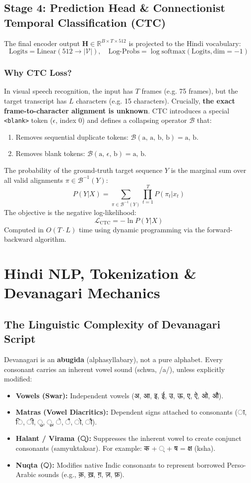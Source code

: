 \documentclass[11pt,a4paper]{article}
\begin{document}
\subsection{Stage 4: Prediction Head \& Connectionist Temporal Classification (CTC)}
The final encoder output $\mathbf{H} \in \mathbb{R}^{B \times T \times 512}$ is projected to the Hindi vocabulary:
$$\text{Logits} = \text{Linear}(512 \to |\mathcal{V}|), \quad \text{Log-Probs} = \log\text{softmax}(\text{Logits}, \text{dim}=-1)$$

\subsubsection{Why CTC Loss?}
In visual speech recognition, the input has $T$ frames (e.g. 75 frames), but the target transcript has $L$ characters (e.g. 15 characters). Crucially, \textbf{the exact frame-to-character alignment is unknown}.
CTC introduces a special \texttt{<blank>} token ($\epsilon$, index 0) and defines a collapsing operator $\mathcal{B}$ that:
\begin{enumerate}
    \item Removes sequential duplicate tokens: $\mathcal{B}(\text{a, a, b, b}) = \text{a, b}$.
    \item Removes blank tokens: $\mathcal{B}(\text{a, } \epsilon\text{, b}) = \text{a, b}$.
\end{enumerate}
The probability of the ground-truth target sequence $Y$ is the marginal sum over all valid alignments $\pi \in \mathcal{B}^{-1}(Y)$:
$$P(Y|X) = \sum_{\pi \in \mathcal{B}^{-1}(Y)} \prod_{t=1}^T P(\pi_t | x_t)$$
The objective is the negative log-likelihood:
$$\mathcal{L}_{\text{CTC}} = -\ln P(Y|X)$$
Computed in $O(T \cdot L)$ time using dynamic programming via the forward-backward algorithm.

\section{Hindi NLP, Tokenization \& Devanagari Mechanics}
\subsection{The Linguistic Complexity of Devanagari Script}
Devanagari is an \textbf{abugida} (alphasyllabary), not a pure alphabet. Every consonant carries an inherent vowel sound (schwa, /a/), unless explicitly modified:
\begin{itemize}
    \item \textbf{Vowels (Swar):} Independent vowels (अ, आ, इ, ई, उ, ऊ, ए, ऐ, ओ, औ).
    \item \textbf{Matras (Vowel Diacritics):} Dependent signs attached to consonants (ा, ि, ी, ु, ू, े, ै, ो, ौ).
    \item \textbf{Halant / Virama (्):} Suppresses the inherent vowel to create conjunct consonants (samyuktaksar). For example: क + ् + ष = क्ष (ksha).
    \item \textbf{Nuqta (़):} Modifies native Indic consonants to represent borrowed Perso-Arabic sounds (e.g., क़, ख़, ग़, ज़, फ़).
\end{itemize}
\end{document}
